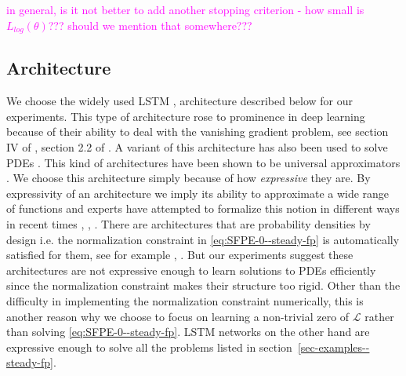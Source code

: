 \textcolor{magenta}{in general, is it not better to add another stopping criterion - how small is $L_{log}(\theta)$??? should we mention that somewhere???}

\subsection{Architecture}\label{ssec-architecture--steady-fp}
We choose the widely used LSTM \cite{sherstinsky2020fundamentals}, \cite{vennerod2021long} architecture described below for our experiments. This type of architecture rose to prominence in deep learning because of their ability to deal with the vanishing gradient problem, see section IV of \cite{sherstinsky2020fundamentals}, section 2.2 of \cite{vennerod2021long}. A variant of this architecture has also been used to solve PDEs \cite{sirignano2018dgm}. This kind of architectures have been shown to be universal approximators \cite{schafer2006recurrent}. We choose this architecture simply because of how \textit{expressive} they are. By  expressivity of an architecture we imply its ability to approximate a wide range of functions and experts have attempted to formalize this notion in different ways in recent times \cite{lu2017expressive}, \cite{raghu2016survey},  \cite{raghu2017expressive}. There are architectures that are probability densities by design i.e. the normalization constraint in \eqref{eq:SFPE-0--steady-fp} is automatically satisfied for them, see for example \cite{uria2013rnade}, \cite{papamakarios2019neural}. But our experiments suggest these architectures are not expressive enough to learn solutions to PDEs efficiently since the normalization constraint makes their structure too rigid. Other than the difficulty in implementing the normalization constraint numerically, this is another reason why we choose to focus on learning a non-trivial zero of $\mathcal L$ rather than solving \eqref{eq:SFPE-0--steady-fp}. LSTM networks on the other hand are expressive enough to solve all the problems listed in section~\ref{sec-examples--steady-fp}.

